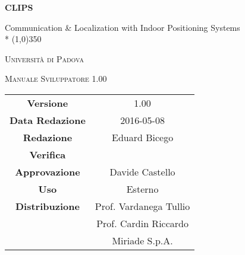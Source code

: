 \documentclass[a4paper,12pt]{article}
\author{Eduard Bicego}
\date{08/05/2016}
\begin{document}
\begin{titlepage}
	\centering
	{\huge\bfseries CLIPS\par}
	Communication \& Localization with Indoor Positioning Systems \\*
	\line(1,0){350} \\
	{\scshape\LARGE Università di Padova \par}
	\vspace{1cm}
	{\scshape\Large Manuale Sviluppatore 1.00 \par}
	\logo
	\newpage
	\begin{tabular}{c|c}
		{\hfill \textbf{Versione}} 			& 1.00						\\
		{\hfill\textbf{Data Redazione}} 	& 2016-05-08  				\\
		{\hfill\textbf{Redazione}} 			& Eduard Bicego				\\
		{\hfill\textbf{Verifica}} 			&  							\\
		{\hfill\textbf{Approvazione}} 		& Davide Castello			\\
		{\hfill\textbf{Uso}} 				& Esterno					\\
		{\hfill\textbf{Distribuzione}} 		& Prof. Vardanega Tullio	\\
											& Prof. Cardin Riccardo 	\\
											& Miriade S.p.A. 			\\
	\end{tabular}
\end{titlepage}
	
	\newpage
	\pagestyle{myfront}
	
		\newpage
			
		\newpage
			\tableofcontents
		\newpage
			\listoffigures
	\label{LastFrontPage}

	\newpage
		\pagestyle{mymain}
	\newpage
		
	\newpage
		
	\newpage
		
	\newpage
		

	\newpage
		
	\newpage
		


		
	\label{LastPage}
\end{document}
